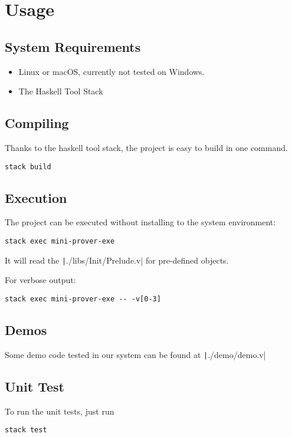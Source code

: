 \section{Usage}

\subsection{System Requirements}
\begin{itemize}
    \item Linux or macOS, currently not tested on Windows.
    \item The Haskell Tool Stack
\end{itemize}

\subsection{Compiling}
Thanks to the haskell tool stack, the project is easy to build in one command.
\begin{center}
\begin{minipage}{0.6\textwidth}
\begin{verbatim}
stack build      
\end{verbatim}
\end{minipage}
\end{center}

\subsection{Execution}
The project can be executed without installing to the system environment:
\begin{center}
\begin{minipage}{0.6\textwidth}
\begin{verbatim}
stack exec mini-prover-exe
\end{verbatim}
\end{minipage}
\end{center}
It will read the \texttt|./libs/Init/Prelude.v| for pre-defined objects.

For verbose output:
\begin{center}
\begin{minipage}{0.6\textwidth}
\begin{verbatim}
stack exec mini-prover-exe -- -v[0-3]
\end{verbatim}
\end{minipage}
\end{center}

\subsection{Demos}
Some demo code tested in our system can be found at \texttt|./demo/demo.v|

\subsection{Unit Test}
To run the unit tests, just run
\begin{center}
\begin{minipage}{0.6\textwidth}
\begin{verbatim}
stack test
\end{verbatim}
\end{minipage}
\end{center}



